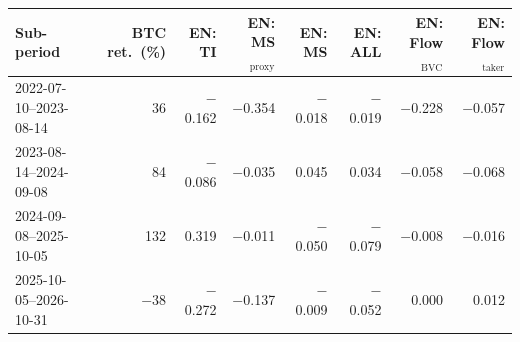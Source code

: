 \begin{tabular}{lrrrrrrr}
\toprule
Sub-period & BTC ret.\ (\%) & EN: TI & EN: MS$_{\text{proxy}}$ & EN: MS & EN: ALL & EN: Flow$_{\text{BVC}}$ & EN: Flow$_{\text{taker}}$\\
\midrule
2022-07-10--2023-08-14 & 36 & \ensuremath{-}0.162 & \ensuremath{-}0.354 & \ensuremath{-}0.018 & \ensuremath{-}0.019 & \ensuremath{-}0.228 & \ensuremath{-}0.057\\
2023-08-14--2024-09-08 & 84 & \ensuremath{-}0.086 & \ensuremath{-}0.035 & 0.045 & 0.034 & \ensuremath{-}0.058 & \ensuremath{-}0.068\\
2024-09-08--2025-10-05 & 132 & 0.319 & \ensuremath{-}0.011 & \ensuremath{-}0.050 & \ensuremath{-}0.079 & \ensuremath{-}0.008 & \ensuremath{-}0.016\\
2025-10-05--2026-10-31 & \ensuremath{-}38 & \ensuremath{-}0.272 & \ensuremath{-}0.137 & \ensuremath{-}0.009 & \ensuremath{-}0.052 & 0.000 & 0.012\\
\bottomrule
\end{tabular}
